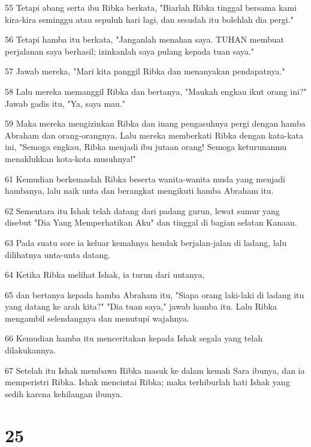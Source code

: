 \par 55 Tetapi abang serta ibu Ribka berkata, "Biarlah Ribka tinggal bersama kami kira-kira seminggu atau sepuluh hari lagi, dan sesudah itu bolehlah dia pergi."
\par 56 Tetapi hamba itu berkata, "Janganlah menahan saya. TUHAN membuat perjalanan saya berhasil; izinkanlah saya pulang kepada tuan saya."
\par 57 Jawab mereka, "Mari kita panggil Ribka dan menanyakan pendapatnya."
\par 58 Lalu mereka memanggil Ribka dan bertanya, "Maukah engkau ikut orang ini?" Jawab gadis itu, "Ya, saya mau."
\par 59 Maka mereka mengizinkan Ribka dan inang pengasuhnya pergi dengan hamba Abraham dan orang-orangnya. Lalu mereka memberkati Ribka dengan kata-kata ini, "Semoga engkau, Ribka menjadi ibu jutaan orang! Semoga keturunanmu menaklukkan kota-kota musuhnya!"
\par 61 Kemudian berkemaslah Ribka beserta wanita-wanita muda yang menjadi hambanya, lalu naik unta dan berangkat mengikuti hamba Abraham itu.
\par 62 Sementara itu Ishak telah datang dari padang gurun, lewat sumur yang disebut "Dia Yang Memperhatikan Aku" dan tinggal di bagian selatan Kanaan.
\par 63 Pada suatu sore ia keluar kemahnya hendak berjalan-jalan di ladang, lalu dilihatnya unta-unta datang.
\par 64 Ketika Ribka melihat Ishak, ia turun dari untanya,
\par 65 dan bertanya kepada hamba Abraham itu, "Siapa orang laki-laki di ladang itu yang datang ke arah kita?" "Dia tuan saya," jawab hamba itu. Lalu Ribka mengambil selendangnya dan menutupi wajahnya.
\par 66 Kemudian hamba itu menceritakan kepada Ishak segala yang telah dilakukannya.
\par 67 Setelah itu Ishak membawa Ribka masuk ke dalam kemah Sara ibunya, dan ia memperistri Ribka. Ishak mencintai Ribka; maka terhiburlah hati Ishak yang sedih karena kehilangan ibunya.

\chapter{25}

